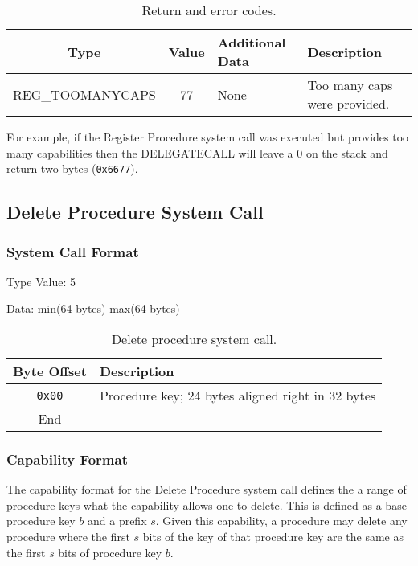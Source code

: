 \documentclass[english,a4paper]{article}
\let\oldparagraph\subsubsection
\renewcommand{\subsubsection}[1]{\oldparagraph{#1}\mbox{}}
\begin{document}
\begin{table}[H]
  \caption{Return and error codes.}
  \centering{}%
  \begin{tabularx}{\textwidth}{c|c|l|X}
    \hline
    Type & Value & Additional Data & Description \\
    \hline
    \hline
    REG\_TOOMANYCAPS  & 77 & None & Too many caps were provided. \\
    \hline
  \end{tabularx}
\end{table}

For example, if the Register
Procedure system call was executed but provides too many capabilities then the
DELEGATECALL will leave a 0 on the stack and return two bytes (\texttt{0x6677}).

\subsection{Delete Procedure System Call}

\subsubsection{System Call Format}
Type Value: 5

Data: min(64 bytes) max(64 bytes)

\begin{table}[H]
  \caption{Delete procedure system call.}
  \centering{}%
  \begin{tabularx}{\textwidth}{c|X}
    \hline
    Byte Offset & Description\\
    \hline
    \hline
    \texttt{0x00} & Procedure key; 24 bytes aligned right in 32 bytes \\
    \hline
    End &  \\
    \hline
  \end{tabularx}
\end{table}

\subsubsection{Capability Format}
The capability format for the Delete Procedure system call defines the a range
of procedure keys what the capability allows one to delete. This is defined as a
base procedure key $b$ and a prefix $s$. Given this capability, a procedure may
delete any procedure where the first $s$ bits of the key of that procedure key are
the same as the first $s$ bits of procedure key $b$.
\end{document}
